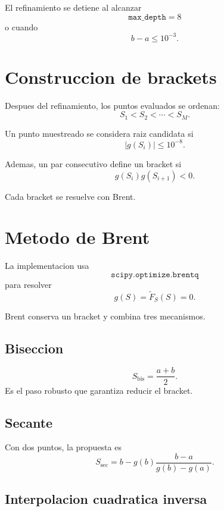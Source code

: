 \documentclass[11pt]{article}
\begin{document}
El refinamiento se detiene al alcanzar
\[
\texttt{max\_depth}=8
\]
o cuando
\[
b-a\le10^{-3}.
\]

\section{Construccion de brackets}

Despues del refinamiento, los puntos evaluados se ordenan:
\[
S_1<S_2<\cdots<S_M.
\]

Un punto muestreado se considera raiz candidata si
\begin{equation}
|g(S_i)|\le10^{-8}.
\label{eq:near-root}
\end{equation}

Ademas, un par consecutivo define un bracket si
\begin{equation}
g(S_i)g(S_{i+1})<0.
\label{eq:bracket}
\end{equation}

Cada bracket se resuelve con Brent.

\section{Metodo de Brent}

La implementacion usa
\[
\texttt{scipy.optimize.brentq}
\]
para resolver
\[
g(S)=\widetilde F_S(S)=0.
\]

Brent conserva un bracket y combina tres mecanismos.

\subsection{Biseccion}

\[
S_{\mathrm{bis}}
=
\frac{a+b}{2}.
\]
Es el paso robusto que garantiza reducir el bracket.

\subsection{Secante}

Con dos puntos, la propuesta es
\begin{equation}
S_{\mathrm{sec}}
=
b
-
g(b)
\frac{b-a}{g(b)-g(a)}.
\label{eq:secant}
\end{equation}

\subsection{Interpolacion cuadratica inversa}
\end{document}

